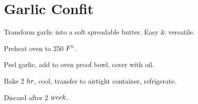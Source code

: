 \section[Garlic Confit]{Garlic Confit~}


\begin{recipestats}[
	servings=4~\fluidounce,
	preptime=5~\minute,
	bakingtime=2~\hour,
	original=\citeauthor{bonAppetitGarlic}~\cite{bonAppetitGarlic},
]
\end{recipestats}


\begin{recipeabstract}
	Transform garlic into a soft spreadable butter.
	Easy \& versatile.
\end{recipeabstract}


\begin{ingredientcolumns}
	\begin{ingredientblock}
	\end{ingredientblock}
	\begin{ingredientblock}
		\ingredient[\approx\onehalf][C]{olive oil}
	\end{ingredientblock}
\end{ingredientcolumns}


\begin{preparation}
\item Preheat oven to 250 $\Fahrenheit$.
\item Peel garlic, add to oven proof bowl, cover with oil.
\item Bake 2 $\hour$, cool, transfer to airtight container, refrigerate.
\item Discard after 2 $\week$.
\end{preparation}


\recipeend%
